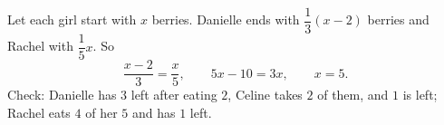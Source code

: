 Let each girl start with $x$ berries. Danielle ends with $\dfrac{1}{3}(x-2)$ berries and Rachel with $\dfrac{1}{5}x$. So
\[\dfrac{x-2}{3}=\dfrac {x}{5},\qquad 5x-10=3x,\qquad x=\boxed{5}.\]
Check: Danielle has $3$ left after eating $2$, Celine takes $2$ of them, and $1$ is left; Rachel eats $4$ of her $5$ and has $1$ left.
